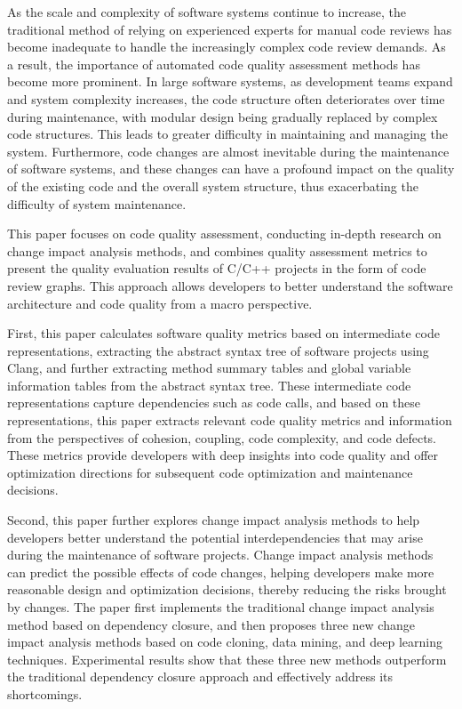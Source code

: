 \begin{eabstract}
  As the scale and complexity of software systems continue to increase, the traditional method of relying on experienced experts for manual code reviews has become inadequate to handle the increasingly complex code review demands. As a result, the importance of automated code quality assessment methods has become more prominent. In large software systems, as development teams expand and system complexity increases, the code structure often deteriorates over time during maintenance, with modular design being gradually replaced by complex code structures. This leads to greater difficulty in maintaining and managing the system. Furthermore, code changes are almost inevitable during the maintenance of software systems, and these changes can have a profound impact on the quality of the existing code and the overall system structure, thus exacerbating the difficulty of system maintenance.

  This paper focuses on code quality assessment, conducting in-depth research on change impact analysis methods, and combines quality assessment metrics to present the quality evaluation results of C/C++ projects in the form of code review graphs. This approach allows developers to better understand the software architecture and code quality from a macro perspective.
  
  First, this paper calculates software quality metrics based on intermediate code representations, extracting the abstract syntax tree of software projects using Clang, and further extracting method summary tables and global variable information tables from the abstract syntax tree. These intermediate code representations capture dependencies such as code calls, and based on these representations, this paper extracts relevant code quality metrics and information from the perspectives of cohesion, coupling, code complexity, and code defects. These metrics provide developers with deep insights into code quality and offer optimization directions for subsequent code optimization and maintenance decisions.
  
  Second, this paper further explores change impact analysis methods to help developers better understand the potential interdependencies that may arise during the maintenance of software projects. Change impact analysis methods can predict the possible effects of code changes, helping developers make more reasonable design and optimization decisions, thereby reducing the risks brought by changes. The paper first implements the traditional change impact analysis method based on dependency closure, and then proposes three new change impact analysis methods based on code cloning, data mining, and deep learning techniques. Experimental results show that these three new methods outperform the traditional dependency closure approach and effectively address its shortcomings.
  

\end{eabstract}
